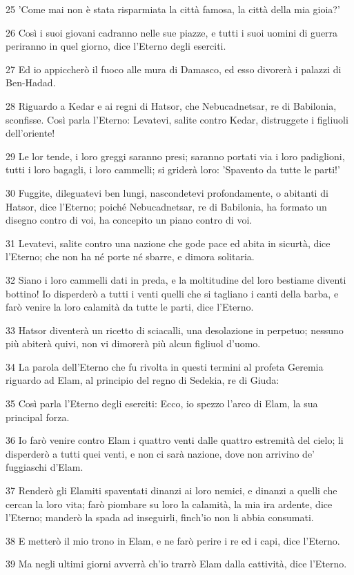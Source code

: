 \par 25 'Come mai non è stata risparmiata la città famosa, la città della mia gioia?'
\par 26 Così i suoi giovani cadranno nelle sue piazze, e tutti i suoi uomini di guerra periranno in quel giorno, dice l'Eterno degli eserciti.
\par 27 Ed io appiccherò il fuoco alle mura di Damasco, ed esso divorerà i palazzi di Ben-Hadad.
\par 28 Riguardo a Kedar e ai regni di Hatsor, che Nebucadnetsar, re di Babilonia, sconfisse. Così parla l'Eterno: Levatevi, salite contro Kedar, distruggete i figliuoli dell'oriente!
\par 29 Le lor tende, i loro greggi saranno presi; saranno portati via i loro padiglioni, tutti i loro bagagli, i loro cammelli; si griderà loro: 'Spavento da tutte le parti!'
\par 30 Fuggite, dileguatevi ben lungi, nascondetevi profondamente, o abitanti di Hatsor, dice l'Eterno; poiché Nebucadnetsar, re di Babilonia, ha formato un disegno contro di voi, ha concepito un piano contro di voi.
\par 31 Levatevi, salite contro una nazione che gode pace ed abita in sicurtà, dice l'Eterno; che non ha né porte né sbarre, e dimora solitaria.
\par 32 Siano i loro cammelli dati in preda, e la moltitudine del loro bestiame diventi bottino! Io disperderò a tutti i venti quelli che si tagliano i canti della barba, e farò venire la loro calamità da tutte le parti, dice l'Eterno.
\par 33 Hatsor diventerà un ricetto di sciacalli, una desolazione in perpetuo; nessuno più abiterà quivi, non vi dimorerà più alcun figliuol d'uomo.
\par 34 La parola dell'Eterno che fu rivolta in questi termini al profeta Geremia riguardo ad Elam, al principio del regno di Sedekia, re di Giuda:
\par 35 Così parla l'Eterno degli eserciti: Ecco, io spezzo l'arco di Elam, la sua principal forza.
\par 36 Io farò venire contro Elam i quattro venti dalle quattro estremità del cielo; li disperderò a tutti quei venti, e non ci sarà nazione, dove non arrivino de' fuggiaschi d'Elam.
\par 37 Renderò gli Elamiti spaventati dinanzi ai loro nemici, e dinanzi a quelli che cercan la loro vita; farò piombare su loro la calamità, la mia ira ardente, dice l'Eterno; manderò la spada ad inseguirli, finch'io non li abbia consumati.
\par 38 E metterò il mio trono in Elam, e ne farò perire i re ed i capi, dice l'Eterno.
\par 39 Ma negli ultimi giorni avverrà ch'io trarrò Elam dalla cattività, dice l'Eterno.

